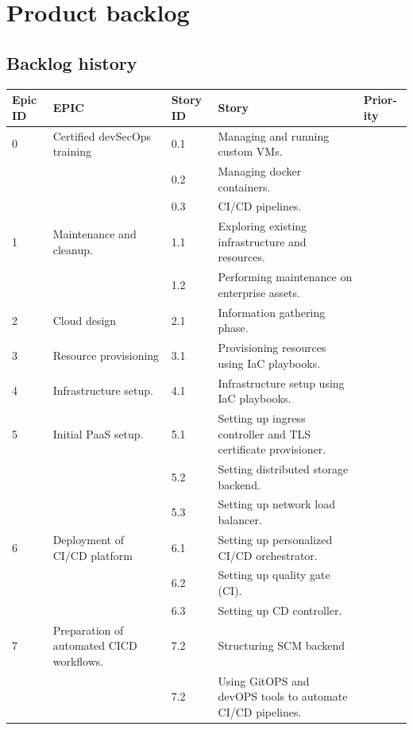\newpage
\section{Product backlog }

\subsection{Backlog history }
\begin{longtable}[H]{|m{1cm}|m{3cm}|m{1cm}|m{7cm}|m{1.2cm}|}
\hline
 {\textbf{Epic ID}} & {\textbf{EPIC}} & {\textbf{Story ID}} & {\textbf{Story}} & {\textbf{Prior-ity}} \\
 \hline
0 & \raggedright Certified devSecOps training &	0.1 &	Managing and running custom VMs. & \\
\cline{3-5}
&   & 0.2 &	Managing docker containers.	& \\
\cline{3-5}
&   & 0.3 &	CI/CD pipelines. & \\
\hline
1 & Maintenance and cleanup. &	1.1	& Exploring existing infrastructure and resources. & \\
\cline{3-5}
&   &	1.2 & Performing maintenance on enterprise assets. & \\

\hline
2 & Cloud design &	2.1 &	Information gathering phase. & \\
\hline
3 & Resource provisioning &	3.1 &	Provisioning resources using IaC playbooks. & \\
\hline
4 & Infrastructure setup. &	4.1 &	Infrastructure setup using IaC playbooks. & \\
\hline
5 & \raggedright Initial PaaS setup. &	5.1 &	Setting up ingress controller and TLS certificate provisioner.	 & \\
\cline{3-5}
&   & 5.2 &	Setting distributed storage backend.	 & \\
\cline{3-5}
&   & 5.3 &	Setting up network load balancer.	 & \\
  \hline
6 & Deployment of CI/CD platform &	6.1 &	Setting up personalized CI/CD orchestrator.	 & \\
\cline{3-5}
&   & 6.2 &	Setting up quality gate (CI).	 & \\
\cline{3-5}
&   & 6.3 & Setting up CD controller.	 & \\
  \hline
7 & \raggedright Preparation of automated CICD workflows. &	7.2 &	Structuring SCM backend	 & \\
\cline{3-5}
&   & 7.2 &	 \raggedright Using GitOPS and devOPS tools to automate CI/CD pipelines.	 & \\
   \hline
   

\end{longtable}
